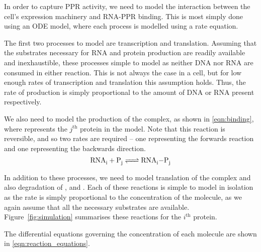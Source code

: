 In order to capture PPR activity, we need to model the interaction between the
cell's expression machinery and RNA-PPR binding.
This is most simply done using an ODE model, where each process is modelled
using a rate equation.

The first two processes to model are transcription and translation. 
Assuming that the substrates necessary for RNA and protein production are
readily available and inexhaustible, these processes simple to
model as neither DNA nor RNA are consumed in either reaction.
This is not always the case in a cell, but for low enough rates of
transcription and translation this assumption holds.
Thus, the rate of production is simply proportional to the amount of DNA or RNA
present respectively.

We also need to model the production of the  complex, as shown in
\ref{eqn:binding}, where  represents the $j^{\mathrm{th}}$ protein in 
the model.
Note that this reaction is reversible, and so two rates are required -- one
representing the forwards reaction and one representing the backwards
direction.
\begin{equation}
  \cee{ RNA_i + P_j <=> RNA_i-P_j }
  \label{eqn:binding}
\end{equation}

In addition to these processes, we need to model translation of the
 complex and also degradation of ,  and .
Each of these reactions is simple to model in isolation as the rate is simply
proportional to the concentration of the molecule, as we again assume that all
the necessary substrates are available.
Figure~\ref{fig:simulation} summarises these reactions for the $i^\mathrm{th}$
protein.

The differential equations governing the concentration of each molecule are 
shown in \ref{eqn:reaction_equations}.

